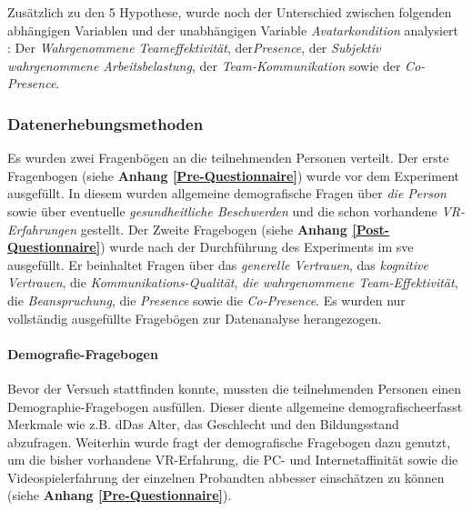 \documentclass[a4paper,11pt]{article}%
\renewcommand{\\}{\vspace*{0.5\baselineskip} \newline}
\begin{document}
Zusätzlich zu den 5 Hypothese, wurde noch der Unterschied zwischen folgenden abhängigen Variablen und der unabhängigen Variable \textit{Avatarkondition} analysiert : Der \textit{Wahrgenommene Teameffektivität}, der\textit{Presence}, der \textit{Subjektiv wahrgenommene Arbeitsbelastung}, der \textit{Team-Kommunikation} sowie der \textit{Co-Presence}.
				

			\subsubsection{Datenerhebungsmethoden}
Es wurden zwei Fragenbögen an die teilnehmenden Personen verteilt. Der erste Fragenbogen (siehe \textbf{Anhang \ref{Pre-Questionnaire}}) wurde vor dem Experiment ausgefüllt. In diesem wurden allgemeine demografische Fragen über \textit{die Person} sowie über eventuelle \textit{gesundheitliche Beschwerden} und die schon vorhandene \textit{VR-Erfahrungen} gestellt. Der Zweite Fragebogen (siehe \textbf{Anhang \ref{Post-Questionnaire}}) wurde nach der Durchführung des Experiments im \ac{sve} ausgefüllt. Er beinhaltet Fragen über das \textit{generelle Vertrauen}, das \textit{kognitive Vertrauen}, die \textit{Kommunikations-Qualität}, \textit{die wahrgenommene Team-Effektivität}, die \textit{Beanspruchung}, die \textit{Presence} sowie die \textit{Co-Presence}. 
Es wurden nur vollständig ausgefüllte Fragebögen zur Datenanalyse herangezogen. \\
				
		\paragraph{Demografie-Fragebogen}
Bevor der Versuch stattfinden konnte, mussten die teilnehmenden Personen einen Demographie-Fragebogen ausfüllen. Dieser diente allgemeine demografischeerfasst Merkmale wie z.B. dDas Alter, das Geschlecht und den Bildungsstand abzufragen. Weiterhin wurde fragt der demografische Fragebogen dazu genutzt, um die bisher vorhandene VR-Erfahrung, die PC- und Internetaffinität sowie die Videospielerfahrung der einzelnen Probandten abbesser einschätzen zu können (siehe \textbf{Anhang \ref{Pre-Questionnaire}}).
\end{document}
